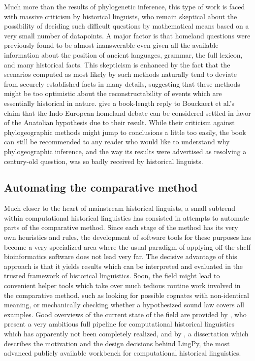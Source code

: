 Much more than the results of phylogenetic inference, this type of work is faced with massive criticism by historical linguists, who remain skeptical about the possibility of deciding such difficult questions by mathematical means based on a very small number of datapoints. A major factor is that homeland questions were previously found to be almost inanswerable even given all the available information about the position of ancient languages, grammar, the full lexicon, and many historical facts. This skepticism is enhanced by the fact that the scenarios computed as most likely by such methods naturally tend to deviate from securely established facts in many details, suggesting that these methods might be too optimistic about the reconstructability of events which are essentially historical in nature. \citet{pereltsvaig_lewis_2015} give a book-length reply to Bouckaert et al.'s claim that the Indo-European homeland debate can be considered settled in favor of the Anatolian hypothesis due to their result. While 
their criticism against phylogeographic methods might jump to conclusions a little too easily, the book can still be recommended to any reader who would like to understand why phylogeographic inference, and the way its results were advertised as resolving a century-old question, was so badly received by historical linguists.

\subsection{Automating the comparative method}
Much closer to the heart of mainstream historical linguists, a small subtrend within computational historical linguistics has consisted in attempts to automate parts of the comparative method. Since each stage of the method has its very own heuristics and rules, the development of software tools for these purposes has become a very specialized area where the usual paradigm of applying off-the-shelf bioinformatics software does not lead very far. The decisive advantage of this approach is that it yields results which can be interpreted and evaluated in the trusted framework of historical linguistics. Soon, the field might lead to convenient helper tools which take over much tedious routine work involved in the comparative method, such as looking for possible cognates with non-identical meaning, or mechanically checking whether a hypothesized sound law covers all examples. Good overviews of the current state of the field are provided by \citet{steiner_ea_2011}, who present a very ambitious full pipeline for 
computational historical linguistics which has apparently not been completely realized, and by \citet{list2014}, a dissertation which describes the motivation and the design decisions behind LingPy, the most advanced publicly available workbench for computational historical linguistics.

